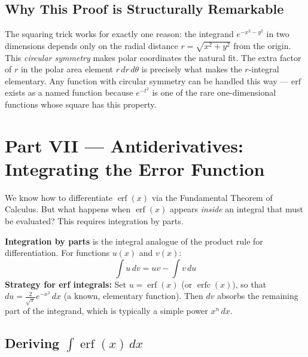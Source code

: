 \documentclass[11pt]{article}
\begin{document}
\subsection{Why This Proof is Structurally Remarkable}

\begin{conceptbox}
The squaring trick works for exactly one reason: the integrand $e^{-x^2-y^2}$ in two dimensions depends only on the radial distance $r = \sqrt{x^2+y^2}$ from the origin. This \textit{circular symmetry} makes polar coordinates the natural fit. The extra factor of $r$ in the polar area element $r\,dr\,d\theta$ is precisely what makes the $r$-integral elementary. Any function with circular symmetry can be handled this way --- $\text{erf}$ exists as a named function because $e^{-t^2}$ is one of the rare one-dimensional functions whose square has this property.
\end{conceptbox}

\clearpage
{}
{}
\section*{Part VII --- Antiderivatives: Integrating the Error Function}
\setcounter{section}{7}

We know how to differentiate $\operatorname{erf}(x)$ via the Fundamental Theorem of Calculus. But what happens when $\operatorname{erf}(x)$ appears \textit{inside} an integral that must be evaluated? This requires integration by parts.

\begin{defnbox}
\textbf{Integration by parts} is the integral analogue of the product rule for differentiation. For functions $u(x)$ and $v(x)$:
\[
\int u\,dv = uv - \int v\,du
\]
\textbf{Strategy for erf integrals:} Set $u = \operatorname{erf}(x)$ (or $\operatorname{erfc}(x)$), so that $du = \frac{2}{\sqrt{\pi}}e^{-x^2}\,dx$ (a known, elementary function). Then $dv$ absorbs the remaining part of the integrand, which is typically a simple power $x^n\,dx$.
\end{defnbox}

\subsection{Deriving $\int \operatorname{erf}(x)\,dx$}
\end{document}
